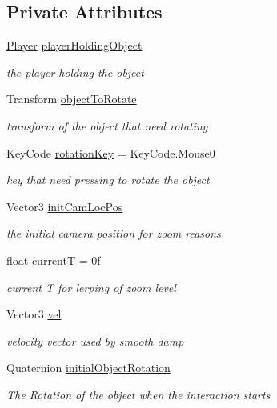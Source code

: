 \subsection*{Private Attributes}
\begin{DoxyCompactItemize}
\item 
\mbox{\hyperlink{class_player}{Player}} \mbox{\hyperlink{class_rotate_and_zoom_component_a23043ca556a278ade0b2b55ba849844c}{player\+Holding\+Object}}
\begin{DoxyCompactList}\small\item\em the player holding the object \end{DoxyCompactList}\item 
Transform \mbox{\hyperlink{class_rotate_and_zoom_component_a752201d107b44a70e657f7024a250116}{object\+To\+Rotate}}
\begin{DoxyCompactList}\small\item\em transform of the object that need rotating \end{DoxyCompactList}\item 
Key\+Code \mbox{\hyperlink{class_rotate_and_zoom_component_a2fede316c27329fc1bd1fb1c8f2bbfa0}{rotation\+Key}} = Key\+Code.\+Mouse0
\begin{DoxyCompactList}\small\item\em key that need pressing to rotate the object \end{DoxyCompactList}\item 
Vector3 \mbox{\hyperlink{class_rotate_and_zoom_component_a6a3704e758eaf77ee29764845052dbcf}{init\+Cam\+Loc\+Pos}}
\begin{DoxyCompactList}\small\item\em the initial camera position for zoom reasons \end{DoxyCompactList}\item 
float \mbox{\hyperlink{class_rotate_and_zoom_component_a420363e569184cd0923a3c6dff6019ca}{currentT}} = 0f
\begin{DoxyCompactList}\small\item\em current T for lerping of zoom level \end{DoxyCompactList}\item 
Vector3 \mbox{\hyperlink{class_rotate_and_zoom_component_ad5f4bb60f7d02385cded9602eb48822a}{vel}}
\begin{DoxyCompactList}\small\item\em velocity vector used by smooth damp \end{DoxyCompactList}\item 
Quaternion \mbox{\hyperlink{class_rotate_and_zoom_component_a616cda2bf47fa6d5a99c0678e3e51ae8}{initial\+Object\+Rotation}}
\begin{DoxyCompactList}\small\item\em The Rotation of the object when the interaction starts \end{DoxyCompactList}\end{DoxyCompactItemize}


